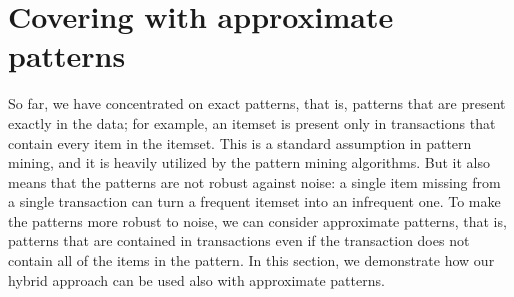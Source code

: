 
\newcommand{\B}{\ensuremath{\{0,1\}}}
\newcommand{\matr}[1]{\ensuremath{\mathbf{#1}}}
\newcommand{\newvec}[1]{\ensuremath{\mathbf{#1}}}
    \newcommand{\nva}{\newvec{a}}
    \newcommand{\nvb}{\newvec{b}}
    \newcommand{\vc}{\newvec{c}}
    \newcommand{\vd}{\newvec{d}}
    \newcommand{\ve}{\newvec{e}}
    \newcommand{\vf}{\newvec{f}}
    \newcommand{\vg}{\newvec{g}}
    \newcommand{\vh}{\newvec{h}}
    \newcommand{\vi}{\newvec{i}}
    \newcommand{\vj}{\newvec{j}}
    \newcommand{\vk}{\newvec{k}}
    \newcommand{\vl}{\newvec{l}}
    \newcommand{\vm}{\newvec{m}}
    \newcommand{\vn}{\newvec{n}}
    \newcommand{\vo}{\newvec{o}}
    \newcommand{\vp}{\newvec{p}}
    \newcommand{\vq}{\newvec{q}}
    \newcommand{\vr}{\newvec{r}}
    \newcommand{\vt}{\newvec{t}}
    \newcommand{\nvu}{\newvec{u}}
    \newcommand{\vv}{\newvec{v}}
    \newcommand{\vw}{\newvec{w}}
    \newcommand{\vx}{\newvec{x}}
    \newcommand{\vy}{\newvec{y}}
    \newcommand{\vz}{\newvec{z}}
    \newcommand{\mA}{\matr{A}}
    \newcommand{\mB}{\matr{B}}
    \newcommand{\mC}{\matr{C}}
    \newcommand{\mD}{\matr{D}}
    \newcommand{\mE}{\matr{E}}
    \newcommand{\mF}{\matr{F}}
    \newcommand{\mG}{\matr{G}}
    \newcommand{\mH}{\matr{H}}
    \newcommand{\mI}{\matr{I}}
    \newcommand{\mJ}{\matr{J}}
    \newcommand{\mK}{\matr{K}}
    \newcommand{\mL}{\matr{L}}
    \newcommand{\mM}{\matr{M}}
    \newcommand{\mN}{\matr{N}}
    \newcommand{\mO}{\matr{O}}
    \newcommand{\mP}{\matr{P}}
    \newcommand{\mQ}{\matr{Q}}
    \newcommand{\mR}{\matr{R}}
    \newcommand{\mS}{\matr{S}}
    \newcommand{\mT}{\matr{T}}
    \newcommand{\mU}{\matr{U}}
    \newcommand{\mV}{\matr{V}}
    \newcommand{\mW}{\matr{W}}
    \newcommand{\mX}{\matr{X}}
    \newcommand{\mY}{\matr{Y}}
    \newcommand{\mZ}{\matr{Z}}


\section{Covering with approximate patterns}\label{sec:tiling}

So far, we have concentrated on exact patterns, that is, patterns that are present exactly in the data; for example, an itemset is present only in transactions that contain every item in the itemset. This is a standard assumption in pattern mining, and it is heavily utilized by the pattern mining algorithms. But it also means that the patterns are not robust against noise: a single item missing from a single transaction can turn a frequent itemset into an infrequent one. To make the patterns more robust to noise, we can consider approximate patterns, that is, patterns that are  contained in transactions even if the transaction does not contain all of the items in the pattern. In this section, we demonstrate how our hybrid approach can be used also with approximate patterns.

